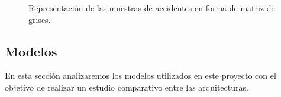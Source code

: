         \begin{figure}[H]
            \centering
            
            
            

            \caption{Representación de las muestras de accidentes en forma de matriz de grises.}
            \label{SampledImagesExampleImage}
        \end{figure}

    \subsection{Modelos}


        En esta sección analizaremos los modelos utilizados en este proyecto con el objetivo de realizar un estudio comparativo entre las arquitecturas.


